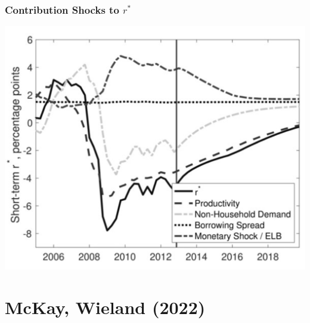 \documentclass[english,xcolor=svgnames]{beamer}
\begin{document}
\begin{frame}
    \frametitle{Contribution Shocks to $r^*$}
    \begin{center}
    	\includegraphics[scale=0.3]{figures/MWFIG11.png}	
    \end{center}
\end{frame}

\section{McKay, Wieland (2022)}
\end{document}
